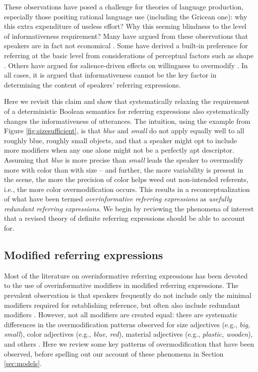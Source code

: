 \documentclass[11pt]{article}
\newcommand{\figref}[1]{Figure \ref{#1}}
\newcommand{\sectionref}[1]{Section \ref{#1}}
\begin{document}
These observations have posed a challenge for theories of language production, especially those positing rational language use (including the Gricean one): why this extra expenditure of useless effort? Why this seeming blindness to the level of informativeness requirement? Many have argued from these observations that speakers are in fact not economical \cite{Engelhardt2006, Pechmann1989}. Some have derived a built-in preference for referring at the basic level from considerations of perceptual factors such as shape \cite{Rosch1976, Rosch1973, murphy1982basic}. Others have argued for salience-driven effects on willingness to overmodify \cite{Gatt2014, Westerbeek2015}. In all cases, it is argued that informativeness cannot be the key factor in determining the content of speakers' referring expressions. 

Here we revisit this claim and show that systematically relaxing the requirement of a deterministic Boolean semantics for referring expressions also systematically changes the informativeness of utterances. The intuition, using the example from \figref{fig:sizesufficient}, is that \emph{blue} and \emph{small} do not apply equally well to all roughly blue, roughly small objects, and that a speaker might opt to include more modifiers when any one alone might not be a perfectly apt descriptor. Assuming that \emph{blue} is more precise than \emph{small} leads the speaker to overmodify more with color than with size -- and further, the more variability is present in the scene, the more the precision of color helps weed out non-intended referents, i.e., the more color overmodification  occurs. This results in a reconceptualization of what have been termed \emph{overinformative referring expressions} as \emph{usefully redundant referring expressions}. We begin by reviewing the phenomena of interest that a revised theory of definite referring expressions should be able to account for. 

\subsection{Modified referring expressions}
\label{sec:modified}


Most of the literature on overinformative referring expressions has been devoted to the use of overinformative modifiers in modified referring expressions. The prevalent observation is that speakers frequently do not include only the minimal modifiers required for establishing reference, but often also include redundant modifiers \cite{Pechmann1989, nadig2002, Maes2004, Engelhardt2006, Arts2011, Koolen2011}. However, not all modifiers are created equal: there are systematic differences in the overmodification patterns observed for size adjectives (e.g., \emph{big, small}), color adjectives (e.g., \emph{blue, red}), material adjectives (e.g., \emph{plastic, wooden}), and others \cite{sedivy2003a}. Here we review some key patterns of overmodification that have been observed, before spelling out our account of these phenomena in \sectionref{sec:models}.
\end{document}

